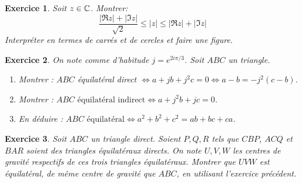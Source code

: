 \documentclass[11pt,a4paper]{article}
\newtheorem{ex}{Exercice}
\begin{document}
\begin{ex}
Soit $z \in \mathbb{C}$. Montrer:
\[
\frac{\left|\Re z\right| + \left|\Im z\right|}{\sqrt 2} \leq |z| \leq \left|\Re z\right| + \left|\Im z\right|
\]
Interpréter en termes de carrés et de cercles et faire une figure.
\end{ex}


\begin{ex}
On note comme d'habitude $j=e^{2i\pi/3}$. Soit $ABC$ un triangle.
\begin{enumerate}
\item Montrer : $ABC$ équilatéral direct 
$\iff  a+jb+j^2c=0 \iff  a-b = -j^2(c-b)$.
\item Montrer : 
$ABC \text{ équilatéral indirect}  \iff a+j^2b+jc=0$.
\item En déduire : $ABC \text{ équilatéral}  \iff a^2+b^2+c^2=ab+bc+ca$.
\end{enumerate}
\end{ex}


\begin{ex}
Soit $ABC$ un triangle direct. Soient $P, Q, R$ tels que $CBP$, $ACQ$ et $BAR$ soient des triangles équilatéraux directs. On note $U, V, W$ les centres de gravité respectifs de ces trois triangles équilatéraux. Montrer que $UVW$ est équilatéral, de même centre de gravité que $ABC$, en utilisant l'exercice précédent.
\end{ex}
\end{document}

